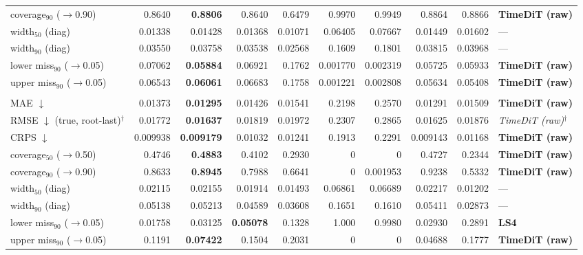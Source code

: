 \documentclass[11pt,a4paper]{article}
\begin{document}
\begin{landscape}
\begin{center}
\begin{tabular}{lrrrrrrrrl}
coverage$_{90}$ ($\to$0.90) & 0.8640 & \textbf{0.8806} & 0.8640 & 0.6479 & 0.9970 & 0.9949 & 0.8864 & 0.8866 & \textbf{TimeDiT (raw)} \\
width$_{50}$ (diag) & 0.01338 & 0.01428 & 0.01368 & 0.01071 & 0.06405 & 0.07667 & 0.01449 & 0.01602 & --- \\
width$_{90}$ (diag) & 0.03550 & 0.03758 & 0.03538 & 0.02568 & 0.1609 & 0.1801 & 0.03815 & 0.03968 & --- \\
lower miss$_{90}$ ($\to$0.05) & 0.07062 & \textbf{0.05884} & 0.06921 & 0.1762 & 0.001770 & 0.002319 & 0.05725 & 0.05933 & \textbf{TimeDiT (raw)} \\
upper miss$_{90}$ ($\to$0.05) & 0.06543 & \textbf{0.06061} & 0.06683 & 0.1758 & 0.001221 & 0.002808 & 0.05634 & 0.05408 & \textbf{TimeDiT (raw)} \\
\addlinespace
\multicolumn{10}{l}{\textbf{rv ($M$ scalar)}} \\
MAE $\downarrow$ & 0.01373 & \textbf{0.01295} & 0.01426 & 0.01541 & 0.2198 & 0.2570 & 0.01291 & 0.01509 & \textbf{TimeDiT (raw)} \\
RMSE $\downarrow$ (true, root-last)$^{\dagger}$ & 0.01772 & \textbf{0.01637} & 0.01819 & 0.01972 & 0.2307 & 0.2865 & 0.01625 & 0.01876 & \textit{TimeDiT (raw)}$^{\dagger}$ \\
CRPS $\downarrow$ & 0.009938 & \textbf{0.009179} & 0.01032 & 0.01241 & 0.1913 & 0.2291 & 0.009143 & 0.01168 & \textbf{TimeDiT (raw)} \\
coverage$_{50}$ ($\to$0.50) & 0.4746 & \textbf{0.4883} & 0.4102 & 0.2930 & 0 & 0 & 0.4727 & 0.2344 & \textbf{TimeDiT (raw)} \\
coverage$_{90}$ ($\to$0.90) & 0.8633 & \textbf{0.8945} & 0.7988 & 0.6641 & 0 & 0.001953 & 0.9238 & 0.5332 & \textbf{TimeDiT (raw)} \\
width$_{50}$ (diag) & 0.02115 & 0.02155 & 0.01914 & 0.01493 & 0.06861 & 0.06689 & 0.02217 & 0.01202 & --- \\
width$_{90}$ (diag) & 0.05138 & 0.05213 & 0.04589 & 0.03608 & 0.1651 & 0.1610 & 0.05411 & 0.02873 & --- \\
lower miss$_{90}$ ($\to$0.05) & 0.01758 & 0.03125 & \textbf{0.05078} & 0.1328 & 1.000 & 0.9980 & 0.02930 & 0.2891 & \textbf{LS4} \\
upper miss$_{90}$ ($\to$0.05) & 0.1191 & \textbf{0.07422} & 0.1504 & 0.2031 & 0 & 0 & 0.04688 & 0.1777 & \textbf{TimeDiT (raw)} \\
\bottomrule
\end{tabular}
\end{center}
\end{landscape}
\end{document}
